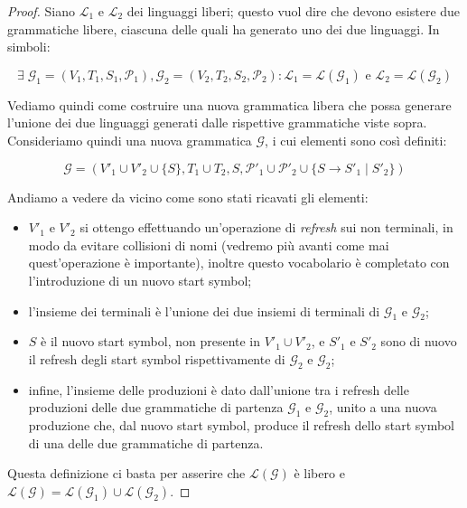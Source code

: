 \documentclass[class=book, crop=false, oneside, 12pt]{standalone}
\begin{document}
\begin{proof}
    Siano \(\mathcal{L}_1\) e \(\mathcal{L}_2\) dei linguaggi liberi; questo vuol dire che devono esistere due grammatiche libere, ciascuna delle quali ha generato uno dei due linguaggi. In simboli:

  \begin{equation*}
    \exists\; \mathcal{G}_1 = (V_1, T_1, S_1, \mathcal{P}_1), \mathcal{G}_2 = (V_2, T_2, S_2, \mathcal{P}_2) : \mathcal{L}_1 = \mathcal{L}(\mathcal{G}_1) \textrm{ e } \mathcal{L}_2 = \mathcal{L}(\mathcal{G}_2)
  \end{equation*}

  Vediamo quindi come costruire una nuova grammatica libera che possa generare l'unione dei due linguaggi generati dalle rispettive grammatiche viste sopra. Consideriamo quindi una nuova grammatica \(\mathcal{G}\), i cui elementi sono così definiti:

  \begin{equation*}
      \mathcal{G} = (V'_1 \cup V'_2 \cup \{S\}, T_1 \cup T_2, S, \mathcal{P}'_1 \cup \mathcal{P}'_2 \cup \{S \rightarrow S'_1 \mid S'_2\})
  \end{equation*}

  \noindent Andiamo a vedere da vicino come sono stati ricavati gli elementi:

  \begin{itemize}
    \item \(V'_1\) e \(V'_2\) si ottengo effettuando un'operazione di \emph{refresh} sui non terminali, in modo da evitare collisioni di nomi (vedremo più avanti come mai quest'operazione è importante), inoltre questo vocabolario è completato con l'introduzione di un nuovo start symbol;
    \item l'insieme dei terminali è l'unione dei due insiemi di terminali di \(\mathcal{G}_1\) e \(\mathcal{G}_2\);
    \item \(S\) è il nuovo start symbol, non presente in \(V'_1 \cup V'_2\), e \(S'_1\) e \(S'_2\) sono di nuovo il refresh degli start symbol rispettivamente di \(\mathcal{G}_2\) e \(\mathcal{G}_2\);
    \item infine, l'insieme delle produzioni è dato dall'unione tra i refresh delle produzioni delle due grammatiche di partenza  \(\mathcal{G}_1\) e \(\mathcal{G}_2\), unito a una nuova produzione che, dal nuovo start symbol, produce il refresh dello start symbol di una delle due grammatiche di partenza.
  \end{itemize}

  \noindent Questa definizione ci basta per asserire che \(\mathcal{L(G)}\) è libero e \(\mathcal{L(G)} = \mathcal{L}(\mathcal{G}_1)  \cup \mathcal{L}(\mathcal{G}_2) \).

\end{proof}
\end{document}
